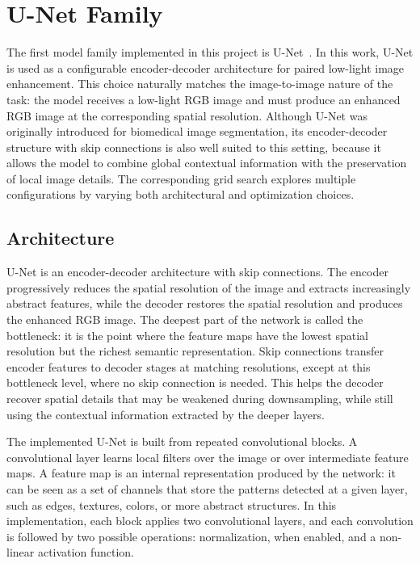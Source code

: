 \section{U-Net Family}

The first model family implemented in this project is U-Net~\cite{DBLP:conf/miccai/RonnebergerFB15}. In this work, U-Net is used as a configurable encoder-decoder architecture for paired low-light image enhancement. This choice naturally matches the image-to-image nature of the task: the model receives a low-light RGB image and must produce an enhanced RGB image at the corresponding spatial resolution. Although U-Net was originally introduced for biomedical image segmentation, its encoder-decoder structure with skip connections is also well suited to this setting, because it allows the model to combine global contextual information with the preservation of local image details. The corresponding grid search explores multiple configurations by varying both architectural and optimization choices.

\subsection{Architecture}

U-Net is an encoder-decoder architecture with skip connections. The encoder progressively reduces the spatial resolution of the image and extracts increasingly abstract features, while the decoder restores the spatial resolution and produces the enhanced RGB image. The deepest part of the network is called the bottleneck: it is the point where the feature maps have the lowest spatial resolution but the richest semantic representation. Skip connections transfer encoder features to decoder stages at matching resolutions, except at this bottleneck level, where no skip connection is needed. This helps the decoder recover spatial details that may be weakened during downsampling, while still using the contextual information extracted by the deeper layers.

The implemented U-Net is built from repeated convolutional blocks. A convolutional layer learns local filters over the image or over intermediate feature maps. A feature map is an internal representation produced by the network: it can be seen as a set of channels that store the patterns detected at a given layer, such as edges, textures, colors, or more abstract structures. In this implementation, each block applies two convolutional layers, and each convolution is followed by two possible operations: normalization, when enabled, and a non-linear activation function.

